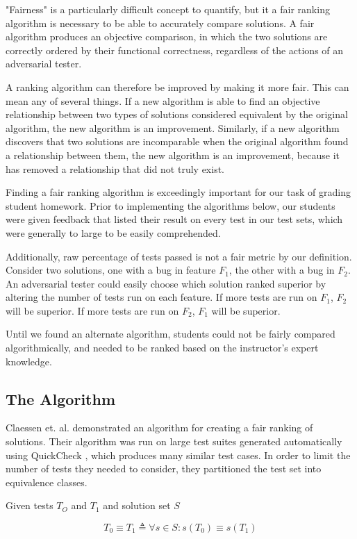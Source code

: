 \documentclass[11pt,twoside]{article}
\newcommand\defined{\triangleq}
\let\cite=\citep
\begin{document}
"Fairness" is a particularly difficult concept to quantify, but it a fair ranking algorithm is necessary to be able to accurately compare solutions. A fair algorithm produces an objective comparison, in which the two solutions are correctly ordered by their functional correctness, regardless of the actions of an adversarial tester.

A ranking algorithm can therefore be improved by making it more fair. This can mean any of several things. If a new algorithm is able to find an objective relationship between two types of solutions considered equivalent by the original algorithm, the new algorithm is an improvement. Similarly, if a new algorithm discovers that two solutions are incomparable when the original algorithm found a relationship between them, the new algorithm is an improvement, because it has removed a relationship that did not truly exist.

Finding a fair ranking algorithm is exceedingly important for our task of grading student homework. Prior to implementing the algorithms below, our students were given feedback that listed their result on every test in our test sets, which were generally to large to be easily comprehended. 

Additionally, raw percentage of tests passed is not a fair metric by our definition. Consider two solutions, one with a bug in feature $F_1$, the other with a bug in $F_2$. An adversarial tester could easily choose which solution ranked superior by altering the number of tests run on each feature. If more tests are run on $F_1$, $F_2$ will be superior. If more tests are run on $F_2$, $F_1$ will be superior. 

Until we found an alternate algorithm, students could not be fairly compared algorithmically, and needed to be ranked based on the instructor's expert knowledge.

\subsection{The Algorithm}
Claessen et. al. demonstrated an algorithm for creating a fair ranking of solutions\cite{Claessen}. Their algorithm was run on large test suites generated automatically using QuickCheck \cite{QuickCheck}, which produces many similar test cases. In order to limit the number of tests they needed to consider, they partitioned the test set into equivalence classes.


\centerline{Given tests $T_O$ and $T_1$ and solution set $S$}
$$ T_0 \equiv T_1 \defined \forall s \in S : s(T_0) \equiv s(T_1) $$
\end{document}
